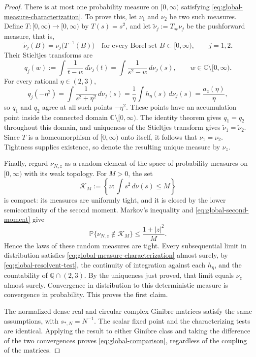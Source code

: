 \documentclass[10pt,a4paper]{amsart}
\begin{document}
\begin{proof}
There is at most one probability measure on $[0,\infty)$ satisfying
\eqref{eq:global-measure-characterization}. To prove this, let $\nu_1$
and $\nu_2$ be two such measures. Define $T:[0,\infty)\to[0,\infty)$
by $T(s)=s^2$, and let $\widetilde\nu_j:=T_\#\nu_j$ be the
pushforward measure, that is,
\[
 \widetilde\nu_j(B)=\nu_j\bigl(T^{-1}(B)\bigr)
 \quad\text{for every Borel set }B\subset[0,\infty),\qquad j=1,2.
\]
Their Stieltjes transforms are
\[
 q_j(w):=\int\frac1{t-w}\,d\widetilde\nu_j(t)
       =\int\frac1{s^2-w}\,d\nu_j(s),
 \qquad w\in\mathbb C\setminus[0,\infty).
\]
For every rational $\eta\in(2,3)$,
\[
 q_j(-\eta^2)=\int\frac1{s^2+\eta^2}\,d\nu_j(s)
 =\frac1\eta\int h_\eta(s)\,d\nu_j(s)
 =\frac{a_z(\eta)}\eta,
\]
so $q_1$ and $q_2$ agree at all such points $-\eta^2$. These points
have an accumulation point inside the connected domain
$\mathbb C\setminus[0,\infty)$. The identity theorem gives $q_1=q_2$
throughout this domain, and uniqueness of the Stieltjes transform gives
$\widetilde\nu_1=\widetilde\nu_2$. Since $T$ is a homeomorphism of
$[0,\infty)$ onto itself, it follows that $\nu_1=\nu_2$.
Tightness supplies existence, so denote the resulting unique measure by
$\nu_z$.

Finally, regard $\nu_{N,z}$ as a random element of the space of probability
measures on $[0,\infty)$ with its weak topology.  For $M>0$, the set
\[
 \mathcal K_M:=\left\{\nu:\int s^2\,d\nu(s)\le M\right\}
\]
is compact: its measures are uniformly tight, and it is closed by the
lower semicontinuity of the second moment.  Markov's inequality and
\eqref{eq:global-second-moment} give
\[
 \mathbb P\{\nu_{N,z}\notin\mathcal K_M\}
 \le\frac{1+|z|^2}{M}.
\]
Hence the laws of these random measures are tight.  Every subsequential
limit in distribution satisfies
\eqref{eq:global-measure-characterization} almost surely, by
\eqref{eq:global-resolvent-test}, the continuity of integration against
each $h_\eta$, and the countability of $\mathbb Q\cap(2,3)$.  By the
uniqueness just proved, that limit equals $\nu_z$ almost surely.
Convergence in distribution to this deterministic measure is convergence
in probability.  This proves the first claim.

The normalized dense real and circular complex Ginibre matrices satisfy
the same assumptions, with $s_{*,N}=N^{-1}$.  The scalar fixed point and
the characterizing tests are identical.  Applying the result to either
Ginibre class and taking the difference of the two convergences proves
\eqref{eq:global-comparison}, regardless of the coupling of the matrices.
\end{proof}
\end{document}

